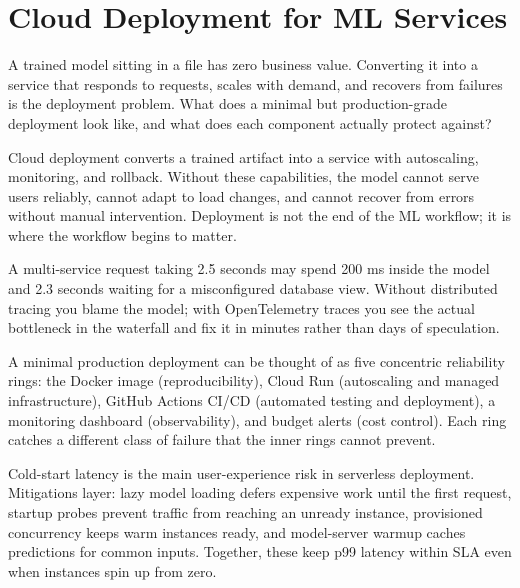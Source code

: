 \documentclass[12pt,a4paper]{article}
\begin{document}
\section*{Cloud Deployment for ML Services}

A trained model sitting in a file has zero business value. Converting it
into a service that responds to requests, scales with demand, and recovers
from failures is the deployment problem. What does a minimal but
production-grade deployment look like, and what does each component
actually protect against?

\begin{concept}
Cloud deployment converts a trained artifact into a service with
autoscaling, monitoring, and rollback. Without these capabilities, the
model cannot serve users reliably, cannot adapt to load changes, and
cannot recover from errors without manual intervention. Deployment is not
the end of the ML workflow; it is where the workflow begins to matter.
\end{concept}

\begin{analogy}
A multi-service request taking 2.5 seconds may spend 200 ms inside the
model and 2.3 seconds waiting for a misconfigured database view. Without
distributed tracing you blame the model; with OpenTelemetry traces you
see the actual bottleneck in the waterfall and fix it in minutes rather
than days of speculation.
\end{analogy}

A minimal production deployment can be thought of as five concentric
reliability rings: the Docker image (reproducibility), Cloud Run
(autoscaling and managed infrastructure), GitHub Actions CI/CD
(automated testing and deployment), a monitoring dashboard
(observability), and budget alerts (cost control). Each ring catches a
different class of failure that the inner rings cannot prevent.

\begin{mentalmodel}
Cold-start latency is the main user-experience risk in serverless
deployment. Mitigations layer: lazy model loading defers expensive work
until the first request, startup probes prevent traffic from reaching
an unready instance, provisioned concurrency keeps warm instances ready,
and model-server warmup caches predictions for common inputs. Together,
these keep p99 latency within SLA even when instances spin up from zero.
\end{mentalmodel}
\end{document}
